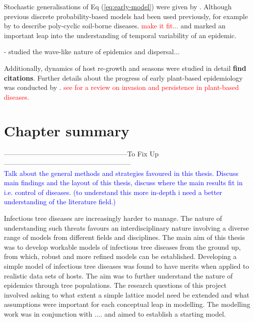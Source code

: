 Stochastic generalisations of Eq (\ref{eq:early-model}) were given by \cite{doi:10.1098/rspb.1999.0841}. Although previous discrete probability-based models had been used previously, for example by \cite{pub.1034311339} to describe poly-cyclic soil-borne diseases. \textcolor{red}{make it fit...} and marked an important leap into the understanding of temporal variability of an epidemic.

-\cite{ferrandino1993dispersive} studied the wave-like nature of epidemics and dispersal...

Additionally, dynamics of host re-growth and seasons were studied in detail \textbf{find citations}. Further details about the progress of early plant-based epidemiology was conducted by \cite{Gilligan-disease-management}.
\textcolor{red}{see\cite{doi:10.1146/annurev.phyto.45.062806.094357} for a review on invasion and persistence in plant-based diseases.}  %


\section{Chapter summary}
------------------------------------------------------To Fix Up--------------------------------------------------------\\

\textcolor{blue}{Talk about the general methods and strategies favoured in this thesis. Discuss main findings and the layout of this thesis, discuss where the main results fit in i.e. control of diseases. (to understand this more in-depth i need a better understanding of the literature field.)}

Infectious tree diseases are increasingly harder to manage. The nature of understanding such threats favours an interdisciplinary nature involving a diverse range of models from different fields and disciplines. The main aim of this thesis was to develop workable models of infectious tree diseases from the ground up, from which, robust and more refined models can be established. Developing a simple model of infectious tree diseases was found to have merits when applied to realistic data sets of hosts. The aim was to further understand the nature of epidemics through tree populations. The research questions of this project involved asking to what extent a simple lattice model need be extended and what assumptions were important for each conceptual leap in modelling. The modelling work was in conjunction with .... and aimed to establish a starting model.

